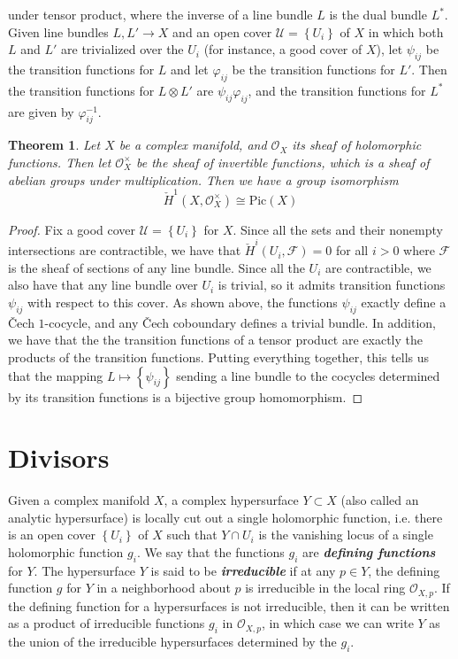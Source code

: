 \documentclass[psamsfonts, 12pt]{amsart}
\newtheorem{thm}{Theorem}[section]
\theoremstyle{definition}
\theoremstyle{remark}
\renewcommand{\O}{\mathcal{O}}
\newcommand{\ib}[1]{\textbf{\textit{#1}}}
\newcommand{\inv}{^{-1}}
\newcommand{\set}[1]{\left\lbrace #1 \right\rbrace}
\begin{document}
under tensor product, where the inverse of a line bundle $L$ is the dual bundle
$L^*$. Given line bundles $L,L' \to X$ and an open cover $\mathcal{U} = \set{U_i}$ of $X$
in which both $L$ and $L'$ are trivialized over the $U_i$ (for instance, a good cover
of $X$), let $\psi_{ij}$ be the transition functions for $L$ and let $\varphi_{ij}$
be the transition functions for $L'$. Then the transition functions for $L\otimes L'$
are $\psi_{ij}\varphi_{ij}$, and the transition functions for $L^*$ are given
by $\varphi_{ij}\inv$.
%
\begin{thm}
Let $X$ be a complex manifold, and $\O_X$ its sheaf of holomorphic functions.
Then let $\O_X^\times$ be the sheaf of invertible functions, which is a
sheaf of abelian groups under multiplication. Then we have a group isomorphism
\[
\check{H}^1(X,\O_X^\times) \cong \mathrm{Pic}(X)
\]
\end{thm}
%
\begin{proof}
Fix a good cover $\mathcal{U} = \set{U_i}$ for $X$. Since all the sets and their
nonempty intersections are contractible, we have that
$\check{H}^i(U_i, \mathcal{F}) = 0$ for all $i > 0$ where $\mathcal{F}$ is the sheaf
of sections of any line bundle. Since all the $U_i$ are contractible, we also
have that any line bundle over $U_i$ is trivial, so it admits transition
functions $\psi_{ij}$ with respect to this cover. As shown above, the
functions $\psi_{ij}$ exactly define a \v{C}ech $1$-cocycle, and any
\v{C}ech coboundary defines a trivial bundle. In addition, we have that
the the transition functions of a tensor product are exactly the products
of the transition functions. Putting everything together, this tells us that
the mapping $L \mapsto \set{\psi_{ij}}$ sending a line bundle to the cocycles
determined by its transition functions is a bijective group homomorphism.
\end{proof}
%
\section{Divisors}
%
Given a complex manifold $X$, a complex hypersurface $Y \subset X$ (also called an
analytic hypersurface) is locally cut out a single holomorphic function, i.e. there is
an open cover $\set{U_i}$ of $X$ such that $Y \cap U_i$ is the vanishing locus of a
single holomorphic function $g_i$. We say that the functions $g_i$ are
\ib{defining functions} for $Y$. The hypersurface $Y$ is said to be \ib{irreducible}
if at any $p \in Y$, the defining function $g$ for $Y$ in a neighborhood about
$p$ is irreducible in the local ring $\O_{X,p}$. If the defining function for a
hypersurfaces is not irreducible, then it can be written as a product of irreducible
functions $g_i$ in $\O_{X,p}$, in which case we can write $Y$ as the union of the
irreducible hypersurfaces determined by the $g_i$. \\
\end{document}
